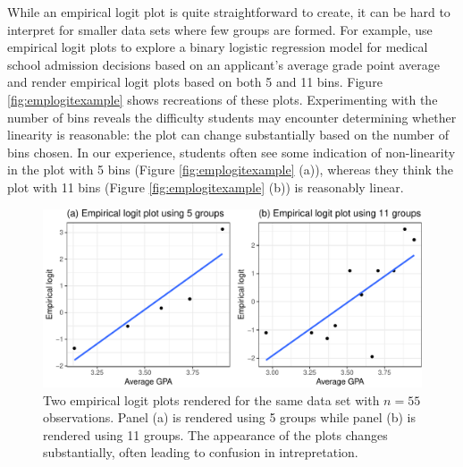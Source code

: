 \documentclass[12pt]{article}
\begin{document}
While an empirical logit plot is quite straightforward to create, it can
be hard to interpret for smaller data sets where few groups are formed.
For example, \citet{stat2} use empirical logit plots to explore a binary
logistic regression model for medical school admission decisions based
on an applicant's average grade point average and render empirical logit
plots based on both 5 and 11 bins. Figure \ref{fig:emplogitexample}
shows recreations of these plots. Experimenting with the number of bins
reveals the difficulty students may encounter determining whether
linearity is reasonable: the plot can change substantially based on the
number of bins chosen. In our experience, students often see some
indication of non-linearity in the plot with 5 bins (Figure
\ref{fig:emplogitexample} (a)), whereas they think the plot with 11 bins
(Figure \ref{fig:emplogitexample} (b)) is reasonably linear.

\begin{figure}

{\centering \includegraphics[width=0.85\linewidth]{vizinf-paper_files/figure-latex/unnamed-chunk-7-1} 

}

\caption{\label{fig:emplogitexample} Two empirical logit plots rendered for the same data set with $n=55$ observations. Panel (a) is rendered using 5 groups while panel (b) is rendered using 11 groups. The appearance of the plots changes substantially, often leading to confusion in intrepretation.}\label{fig:unnamed-chunk-7}
\end{figure}
\end{document}
